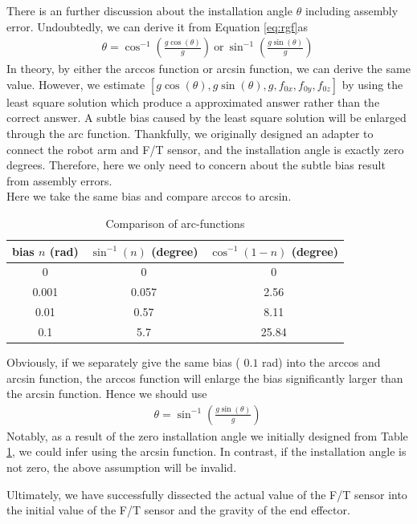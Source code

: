 \par
There is an further discussion about the installation angle $\theta$ including assembly error. Undoubtedly, we can derive it from Equation \ref{eq:rgf}as
\begin{equation}
\begin{split}
\theta = \cos^{-1}\left(\frac{g\cos(\theta)}{g}\right)\ \text{or} \ \sin^{-1}\left(\frac{g\sin(\theta)}{g}\right)\
\end{split}
\end{equation}
In theory, by either the arccos function or arcsin function, we can derive the same value. However, we estimate $[g\cos(\theta),g\sin(\theta),g,f_{0x},f_{0y},f_{0z}]$ by using the least square solution which produce a approximated answer rather than the correct answer. A subtle bias caused by the least square solution will be enlarged through the arc function. 
Thankfully, we originally designed an adapter to connect the robot arm and F/T sensor, and the installation angle is exactly zero degrees. Therefore, here we only need to concern about the subtle bias result from assembly errors.\\
Here we take the same bias and compare arccos to arcsin. 
\begin{table}[htbp]
\centering
\caption{Comparison of arc-functions}
\label{tab:arc}
\begin{tabular}{c|c|c} 
\hline \hline
bias $n$ (rad)	&$\sin^{-1}(n)$	(degree)	&$\cos^{-1}(1-n)$ (degree)\\
\hline
0				&0							&0\\
0.001			&0.057						&2.56\\
0.01			&0.57						&8.11\\
0.1				&5.7						&25.84\\
\hline\hline
\end{tabular}
\end{table}
Obviously, if we separately give the same bias ( $0.1$ rad) into the arccos and arcsin function, the arccos function will enlarge the bias significantly larger than the arcsin function. Hence we should use
\begin{equation}
\begin{split}
\theta = \sin^{-1}\left(\frac{g\sin(\theta)}{g}\right)\
\end{split}
\end{equation}
Notably, as a result of the zero installation angle we initially designed from Table \ref{tab:arc}, we could infer using the arcsin function. In contrast, if the installation angle is not zero, the above assumption will be invalid.
\par
Ultimately, we have successfully dissected the actual value of the F/T sensor into the initial value of the F/T sensor and the gravity of the end effector. 
